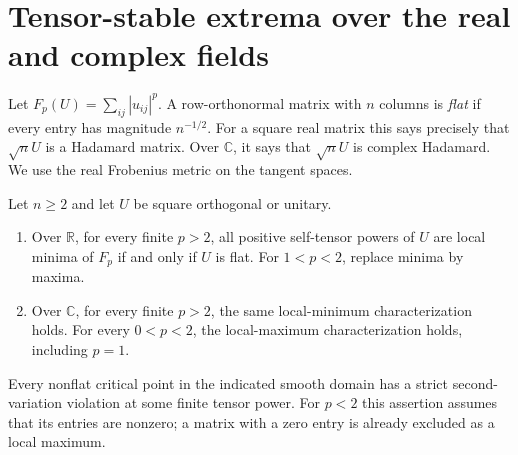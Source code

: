 \maketitle
\begin{abstract}
We give an elementary tangent-trace proof that the orthogonal matrices
whose every self-tensor power locally minimizes entrywise $p$-energy,
$p>2$, are exactly scaled real Hadamard matrices. The same argument
characterizes tensor-stable local maxima for $1<p<2$. On the complex
unitary group the characterization holds for every $p>0$, $p\ne2$,
including $p=1$. The real endpoint $p=1$ fails. The proof supplies
explicit finite-power necessary inequalities, a two-column curvature
certificate, and a dimension-independent quartic flatness estimate.
These are characterization and instability results, not a proof of
real Hadamard existence. Priority has not been established.
\end{abstract}

\section{Tensor-stable extrema over the real and complex fields}
Let $F_p(U)=\sum_{ij}|u_{ij}|^p$. A row-orthonormal matrix with $n$
columns is \emph{flat} if every entry has magnitude $n^{-1/2}$.
For a square real matrix this says precisely that $\sqrt nU$ is a
Hadamard matrix. Over $\mathbb C$, it says that $\sqrt nU$ is complex
Hadamard. We use the real Frobenius metric on the tangent spaces.

\begin{theorem}\label{thm:unified}
Let $n\ge2$ and let $U$ be square orthogonal or unitary.
\begin{enumerate}
\item Over $\mathbb R$, for every finite $p>2$, all positive
self-tensor powers of $U$ are local minima of $F_p$ if and only if
$U$ is flat. For $1<p<2$, replace minima by maxima.
\item Over $\mathbb C$, for every finite $p>2$, the same local-minimum
characterization holds. For every $0<p<2$, the local-maximum
characterization holds, including $p=1$.
\end{enumerate}
Every nonflat critical point in the indicated smooth domain has a
strict second-variation violation at some finite tensor power. For
$p<2$ this assertion assumes that its entries are nonzero; a matrix
with a zero entry is already excluded as a local maximum.
\end{theorem}

